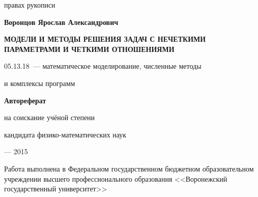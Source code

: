 \newcommand{\sfs}{\fontsize{14pt}{15pt}\selectfont}
\sfs %
\thispagestyle{empty}

\vspace{10mm}
\begin{flushright}
   правах рукописи
\end{flushright}

\vspace{30mm}
\begin{center}
{\Large\bf Воронцов Ярослав Александрович}
\end{center}

\vspace{30mm}
\begin{center}
{\bf \LARGE \MakeUppercase {Модели и методы решения задач с нечеткими параметрами и четкими отношениями}
\par}

\vspace{30mm}
{\Large
05.13.18~--- математическое моделирование, численные методы\par и комплексы программ
}

\vspace{15mm}
\textbf{Автореферат}\par
{} на соискание учёной степени\par
кандидата физико-математических наук
\end{center}

\vspace{40mm}
\begin{center}
{ --- 2015}
\end{center}

\newpage
\thispagestyle{empty}
\noindent Работа выполнена в Федеральном государственном бюджетном образовательном учреждении высшего профессионального образования <<Воронежский государственный университет>>

